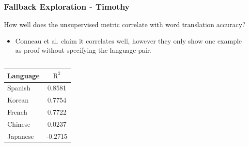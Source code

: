 \documentclass{beamer}
\begin{document}
\begin{frame}
  \frametitle{Fallback Exploration - Timothy}
  How well does the unsupervised metric correlate with word translation accuracy?
  \begin{itemize}
  \item Conneau et al. claim it correlates well, however they only show one example
    as proof without specifying the language pair.
  \end{itemize}
  \begin{columns}
    \begin{table}
      \begin{tabular}{l | c }
      Language & $\text{R}^2$ \\
      \hline \hline
      Spanish & 0.8581 \\
      Korean & 0.7754 \\
      French & 0.7722 \\
      Chinese & 0.0237 \\
      Japanese & -0.2715
      \end{tabular}
    \end{table}
       \\
  \end{columns}
\end{frame}
\end{document}
